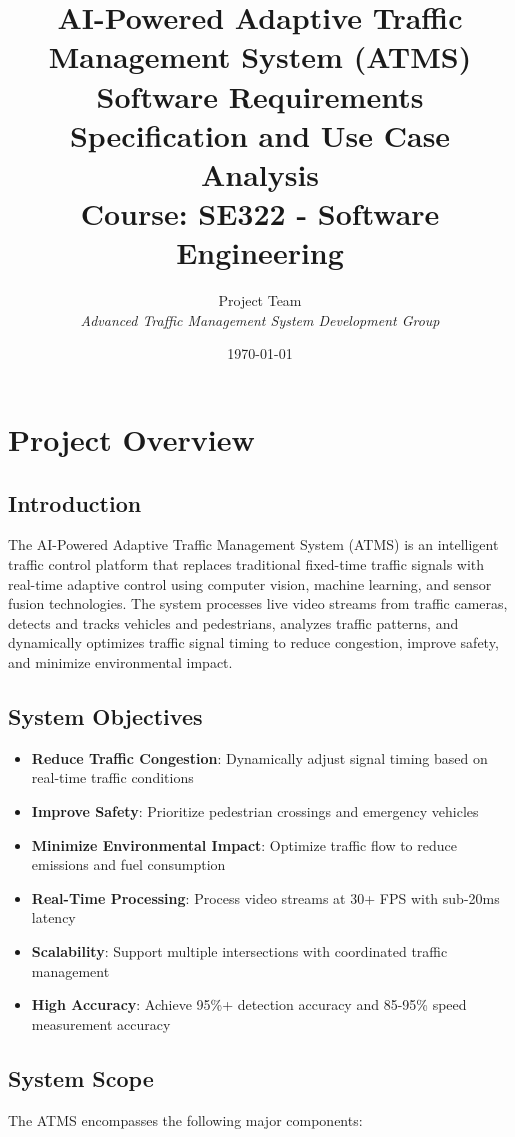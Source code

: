 \documentclass[12pt,a4paper]{article}
\title{%
    \textbf{AI-Powered Adaptive Traffic Management System (ATMS)} \\
    \large Software Requirements Specification and Use Case Analysis \\
    \large Course: SE322 - Software Engineering
}
\author{%
    Project Team \\
    \textit{Advanced Traffic Management System Development Group}
}
\date{\today}
\begin{document}
\maketitle

\newpage
\tableofcontents
\newpage

\section{Project Overview}

\subsection{Introduction}
The AI-Powered Adaptive Traffic Management System (ATMS) is an intelligent traffic control platform that replaces traditional fixed-time traffic signals with real-time adaptive control using computer vision, machine learning, and sensor fusion technologies. The system processes live video streams from traffic cameras, detects and tracks vehicles and pedestrians, analyzes traffic patterns, and dynamically optimizes traffic signal timing to reduce congestion, improve safety, and minimize environmental impact.

\subsection{System Objectives}
\begin{itemize}
    \item \textbf{Reduce Traffic Congestion}: Dynamically adjust signal timing based on real-time traffic conditions
    \item \textbf{Improve Safety}: Prioritize pedestrian crossings and emergency vehicles
    \item \textbf{Minimize Environmental Impact}: Optimize traffic flow to reduce emissions and fuel consumption
    \item \textbf{Real-Time Processing}: Process video streams at 30+ FPS with sub-20ms latency
    \item \textbf{Scalability}: Support multiple intersections with coordinated traffic management
    \item \textbf{High Accuracy}: Achieve 95\%+ detection accuracy and 85-95\% speed measurement accuracy
\end{itemize}

\subsection{System Scope}
The ATMS encompasses the following major components:
\end{document}
